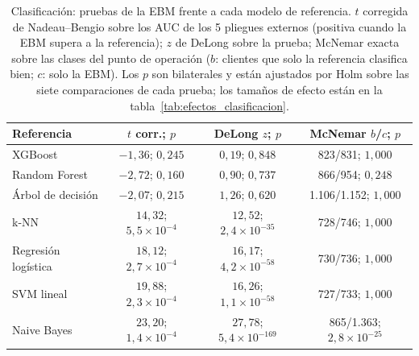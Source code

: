 \begin{table}[tbp]
  \centering\small\setlength{\tabcolsep}{3pt}
  \caption{Clasificación: pruebas de la EBM frente a cada modelo de referencia. $t$ corregida de Nadeau--Bengio sobre los AUC de los 5 pliegues externos (positiva cuando la EBM supera a la referencia); $z$ de DeLong sobre la prueba; McNemar exacta sobre las clases del punto de operación ($b$: clientes que solo la referencia clasifica bien; $c$: solo la EBM). Los $p$ son bilaterales y están ajustados por Holm sobre las siete comparaciones de cada prueba; los tamaños de efecto están en la tabla~\ref{tab:efectos_clasificacion}.}
  \label{tab:pruebas_clasificacion}
  \begin{tabular}{@{}l c c c@{}}
    \toprule
    Referencia & $t$ corr.; $p$ & DeLong $z$; $p$ & McNemar $b$/$c$; $p$ \\
    \midrule
    XGBoost & $-1{,}36$; $0{,}245$ & $0{,}19$; $0{,}848$ & 823/831; $1{,}000$ \\
    Random Forest & $-2{,}72$; $0{,}160$ & $0{,}90$; $0{,}737$ & 866/954; $0{,}248$ \\
    Árbol de decisión & $-2{,}07$; $0{,}215$ & $1{,}26$; $0{,}620$ & 1.106/1.152; $1{,}000$ \\
    k-NN & $14{,}32$; $5{,}5 \times 10^{-4}$ & $12{,}52$; $2{,}4 \times 10^{-35}$ & 728/746; $1{,}000$ \\
    Regresión logística & $18{,}12$; $2{,}7 \times 10^{-4}$ & $16{,}17$; $4{,}2 \times 10^{-58}$ & 730/736; $1{,}000$ \\
    SVM lineal & $19{,}88$; $2{,}3 \times 10^{-4}$ & $16{,}26$; $1{,}1 \times 10^{-58}$ & 727/733; $1{,}000$ \\
    Naive Bayes & $23{,}20$; $1{,}4 \times 10^{-4}$ & $27{,}78$; $5{,}4 \times 10^{-169}$ & 865/1.363; $2{,}8 \times 10^{-25}$ \\
    \bottomrule
  \end{tabular}
\end{table}
